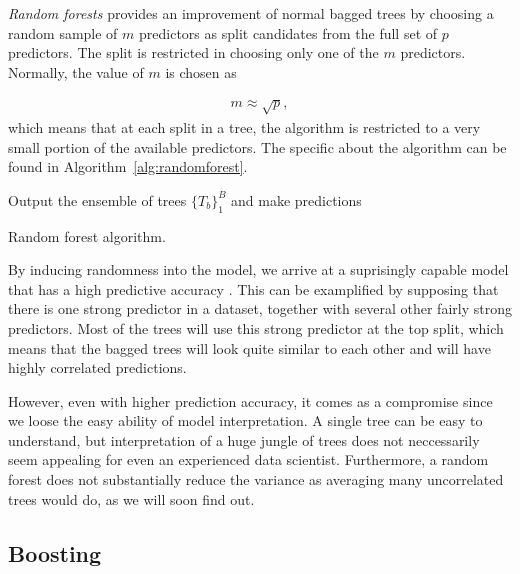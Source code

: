 \textit{Random forests} provides an improvement of normal bagged trees by choosing a random sample of $m$ predictors as split candidates from the full set of $p$ predictors. The split is restricted in choosing only one of the $m$ predictors. Normally, the value of $m$ is chosen as

\begin{align}
  m \approx \sqrt{p},
\end{align}
which means that at each split in a tree, the algorithm is restricted to a very small portion of the available predictors. The specific about the algorithm can be found in Algorithm~\ref{alg:randomforest}.

\begin{algorithm}[H]
\SetAlgoLined
 Output the ensemble of trees $\{T_b\}_1^B$ and make predictions
 \caption{Random forest algorithm.}
 \label{alg:randomforest}
\end{algorithm}


By inducing randomness into the model, we arrive at a suprisingly capable model that has a high predictive accuracy \cite{Caruana2006}. This can be examplified by supposing that there is one strong predictor in a dataset, together with several other fairly strong predictors. Most of the trees will use this strong predictor at the top split, which means that the bagged trees will look quite similar to each other and will have highly correlated predictions.

However, even with higher prediction accuracy, it comes as a compromise since we loose the easy ability of model interpretation. A single tree can be easy to understand, but interpretation of a huge jungle of trees does not neccessarily seem appealing for even an experienced data scientist. Furthermore, a random forest does not substantially reduce the variance as averaging many uncorrelated trees would do, as we will soon find out.

\subsection{Boosting}

